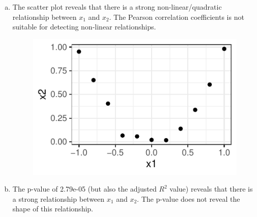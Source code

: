 {\begin{enumerate}[a)]
  The Pearson correlation coefficient is close to 0 - reflecting that there is no \textbf{linear} relationship between $x_1$ and $x_2$.
  
  \item  The scatter plot reveals that there is a strong non-linear/quadratic relationship between $x_1$ and $x_2$. The Pearson correlation coefficients is not suitable
  for detecting non-linear relationships.
  
 \begin{figure}[!ht]
  \centering
  \includegraphics[width=\maxwidth]{figure/add_Points_x1_x2_sol.pdf}
  \label{fig:pdp}
\end{figure}
 
  \item The p-value of 2.79e-05 (but also the adjusted $R^2$ value) reveals that there is a strong relationship between $x_1$ and $x_2$.
  The p-value does not reveal the shape of this relationship.
  

\end{enumerate}}
